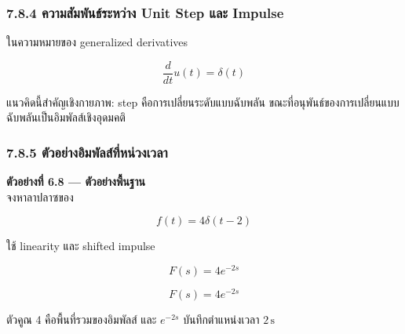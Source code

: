 \subsubsection{7.8.4 ความสัมพันธ์ระหว่าง Unit Step และ Impulse}

ในความหมายของ generalized derivatives

\[
\boxed{\frac{d}{dt}u(t)=\delta(t)}
\]

แนวคิดนี้สำคัญเชิงกายภาพ: step คือการเปลี่ยนระดับแบบฉับพลัน ขณะที่อนุพันธ์ของการเปลี่ยนแบบฉับพลันเป็นอิมพัลส์เชิงอุดมคติ

\subsubsection{7.8.5 ตัวอย่างอิมพัลส์ที่หน่วงเวลา}

\textbf{ตัวอย่างที่ 6.8 — ตัวอย่างพื้นฐาน}\\
จงหาลาปลาซของ

\[
f(t)=4\delta(t-2)
\]

ใช้ linearity และ shifted impulse

\[
F(s)=4e^{-2s}
\]

\[
\boxed{F(s)=4e^{-2s}}
\]

ตัวคูณ 4 คือพื้นที่รวมของอิมพัลส์ และ $e^{-2s}$ บันทึกตำแหน่งเวลา $2\,\mathrm{s}$


